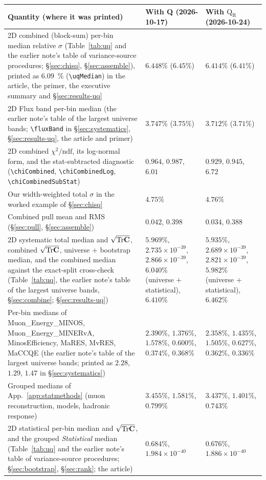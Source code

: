 {\footnotesize
\setlength{\tabcolsep}{3pt}
\begin{longtable}{@{}>{\raggedright\arraybackslash}p{}
                  >{\raggedright\arraybackslash}p{}
                  >{\raggedright\arraybackslash}p{}@{}}
\toprule
Quantity (where it was printed) & With Q (2026-10-17) & With $\mathrm{Q_R}$ (2026-10-24) \\
\midrule
\endhead
2D combined (block-sum) per-bin median relative $\sigma$ (Table~\ref{tab:uq} and the earlier note's table of variance-source procedures; \S\ref{sec:chisq}, \S\ref{sec:assemble}), printed as \SI{6.09}{\percent} (\texttt{\textbackslash uqMedian}) in the article, the primer, the executive summary and \S\ref{sec:results-uq} & $6.448\%$ ($6.45\%$) & $6.414\%$ ($6.41\%$) \\
2D Flux band per-bin median (the earlier note's table of the largest universe bands; \texttt{\textbackslash fluxBand} in \S\ref{sec:systematics}, \S\ref{sec:results-uq}, the article and primer) & $3.747\%$ ($3.75\%$) & $3.712\%$ ($3.71\%$) \\
2D combined $\chi^{2}/\mathrm{ndf}$, its log-normal form, and the stat-subtracted diagnostic (\texttt{\textbackslash chiCombined}, \texttt{\textbackslash chiCombinedLog}, \texttt{\textbackslash chiCombinedSubStat}) & $0.964$, $0.987$, $6.01$ & $0.929$, $0.945$, $6.72$ \\
Our width-weighted total $\sigma$ in the worked example of \S\ref{sec:chisq} & $4.75\%$ & $4.76\%$ \\
Combined pull mean and RMS (\S\ref{sec:pull}, \S\ref{sec:assemble}) & $0.042$, $0.398$ & $0.034$, $0.388$ \\
2D systematic total median and $\sqrt{\mathrm{Tr}\mathbf{C}}$, combined $\sqrt{\mathrm{Tr}\mathbf{C}}$, universe $+$ bootstrap median, and the combined median against the exact-split cross-check (Table~\ref{tab:uq}, the earlier note's table of the largest universe bands, \S\ref{sec:combine}; \S\ref{sec:results-uq}) & $5.969\%$, $2.735\times10^{-39}$, $2.866\times10^{-39}$, $6.040\%$ (universe $+$ statistical), $6.410\%$ & $5.935\%$, $2.689\times10^{-39}$, $2.821\times10^{-39}$, $5.982\%$ (universe $+$ statistical), $6.462\%$ \\
Per-bin medians of Muon\_Energy\_MINOS, Muon\_Energy\_MINERvA, MinosEfficiency, MaRES, MvRES, MaCCQE (the earlier note's table of the largest universe bands; printed as $2.28$, $1.29$, $1.47$ in \S\ref{sec:systematics}) & $2.390\%$, $1.376\%$, $1.578\%$, $0.600\%$, $0.374\%$, $0.368\%$ & $2.358\%$, $1.435\%$, $1.505\%$, $0.627\%$, $0.362\%$, $0.336\%$ \\
Grouped medians of App.~\ref{app:statmethods} (muon reconstruction, models, hadronic response) & $3.455\%$, $1.581\%$, $0.799\%$ & $3.437\%$, $1.401\%$, $0.743\%$ \\
2D statistical per-bin median and $\sqrt{\mathrm{Tr}\mathbf{C}}$, and the grouped \emph{Statistical} median (Table~\ref{tab:uq} and the earlier note's table of variance-source procedures; \S\ref{sec:bootstrap}, \S\ref{sec:rank}; the article) & $0.684\%$, $1.984\times10^{-40}$ & $0.676\%$, $1.886\times10^{-40}$ \\
\bottomrule
\end{longtable}
}

